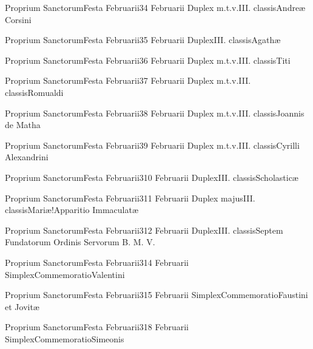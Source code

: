 \documentclass[psalterium-feriale.tex]{subfiles}
\begin{document}
	{Proprium Sanctorum}{Festa Februarii}{3}{4 Februarii}
	{Duplex m.t.v.}{III. classis}{Andreæ Corsini}
	{}
	{}
\COPObRubric

	{Proprium Sanctorum}{Festa Februarii}{3}{5 Februarii}
	{Duplex}{III. classis}{Agathæ}
	{}
	{}
\psalmodiapropria

	{Proprium Sanctorum}{Festa Februarii}{3}{6 Februarii}
	{Duplex m.t.v.}{III. classis}{Titi}
	{}
	{}
\COPObRubric

	{Proprium Sanctorum}{Festa Februarii}{3}{7 Februarii}
	{Duplex m.t.v.}{III. classis}{Romualdi}
	{}
	{}
\COPObRubric

	{Proprium Sanctorum}{Festa Februarii}{3}{8 Februarii}
	{Duplex m.t.v.}{III. classis}{Joannis de Matha}
	{}
	{}
\COPObRubric

	{Proprium Sanctorum}{Festa Februarii}{3}{9 Februarii}
	{Duplex m.t.v.}{III. classis}{Cyrilli Alexandrini}
	{}
	{}
\COPOcRubric

	{Proprium Sanctorum}{Festa Februarii}{3}{10 Februarii}
	{Duplex}{III. classis}{Scholasticæ}
	{}
	{}
\MUVNbRubric

	{Proprium Sanctorum}{Festa Februarii}{3}{11 Februarii}
	{Duplex majus}{III. classis}{Mariæ!Apparitio Immaculatæ}
	{}
	{}
\psalmodiapropria

	{Proprium Sanctorum}{Festa Februarii}{3}{12 Februarii}
	{Duplex}{III. classis}{Septem Fundatorum Ordinis Servorum B. M. V.}
	{}
	{}

	{Proprium Sanctorum}{Festa Februarii}{3}{14 Februarii}
	{Simplex}{Commemoratio}{Valentini}
	{}
	{}
\UMEXaRubric

	{Proprium Sanctorum}{Festa Februarii}{3}{15 Februarii}
	{Simplex}{Commemoratio}{Faustini et Jovitæ}
	{}
	{}
\PMEXaRubric

	{Proprium Sanctorum}{Festa Februarii}{3}{18 Februarii}
	{Simplex}{Commemoratio}{Simeonis}
	{}
	{}
\UMEXaRubric
\end{document}
